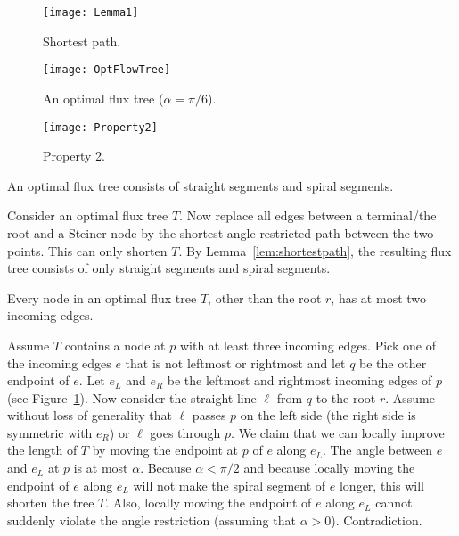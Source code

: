 \documentclass{journalA4}
\begin{document}
\begin{figure}[b]
    \hfill
    \begin{minipage}[t]{.25\textwidth}
        \centering
        \texttt{[image: Lemma1]}
        \small{\caption{Shortest path.\label{fig:Lemma1}}}
    \end{minipage}
    \hfill
    \begin{minipage}[t]{.45\textwidth}
        \centering
        \texttt{[image: OptFlowTree]}
        \small{\caption{An optimal flux tree ($\alpha = \pi/6$).\label{fig:OptFlowTree}}}
    \end{minipage}
    \hfill
    \begin{minipage}[t]{.25\textwidth}
        \centering
        \texttt{[image: Property2]}
        \small{\caption{Property 2.\label{fig:Property2}}}
    \end{minipage}
    \hfill\hfill
\end{figure}

\begin{property}
\label{property:optedgeshape}
An optimal flux tree consists of straight segments and spiral segments.
\end{property}
\medskip

Consider an optimal flux tree $T$. Now replace all edges between a terminal/the root and a Steiner node by the shortest angle-restricted path between the two points. This can only shorten $T$. By Lemma~\ref{lem:shortestpath}, the resulting flux tree consists of only straight segments and spiral segments. \hfill\QED


\begin{property}\label{property:optbinary}
Every node in an optimal flux tree $T$, other than the root $r$, has at most two incoming edges.
\end{property}
\medskip

Assume $T$ contains a node at $p$ with at least three incoming edges. Pick one of the incoming edges $e$ that is not leftmost or rightmost and let $q$ be the
other endpoint of $e$. Let $e_L$ and $e_R$ be the leftmost and rightmost incoming edges of $p$ (see Figure~\ref{fig:Property2}). Now consider the straight line $\ell$ from $q$ to the root $r$. Assume without loss of generality that $\ell$ passes $p$ on the left side (the right side is symmetric with $e_R$) or $\ell$ goes through $p$. We claim that we can locally improve the length of $T$ by moving the endpoint at $p$ of $e$ along $e_L$. The angle between $e$ and $e_L$ at $p$ is at most $\alpha$. Because $\alpha < \pi/2$ and because locally moving the endpoint of $e$ along $e_L$ will not make the spiral segment of $e$ longer, this will shorten the tree $T$. Also, locally moving the endpoint of $e$ along $e_L$ cannot suddenly violate the angle restriction (assuming that $\alpha > 0$). Contradiction.\hfill\QED
\end{document}
